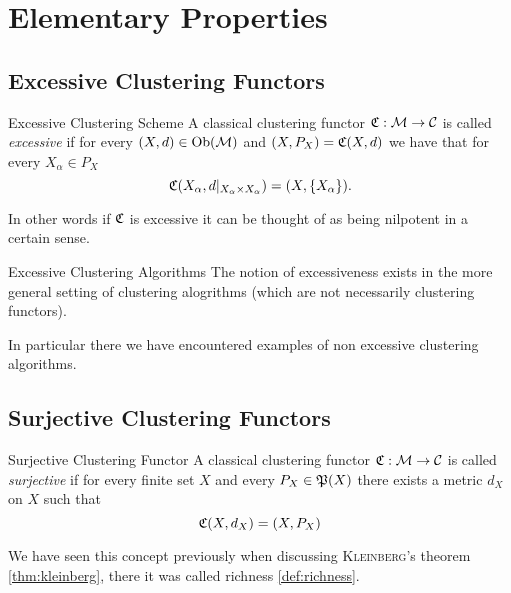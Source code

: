 \section{Elementary Properties}
\subsection{Excessive Clustering Functors}
\begin{definition}{Excessive Clustering Scheme}{}
A classical clustering functor $\Cf: \M \to \C$ is called \emph{excessive} if for every $(X,d) \in \ob(\M)$ and $(X,P_X) = \Cf(X,d)$ we have that for every $X_\alpha \in P_X$
\begin{equation*}
    \Cf(X_\alpha, d|_{X_\alpha \times X_\alpha}) = (X,\{X_\alpha\}).
\end{equation*}
\end{definition}
In other words if $\Cf$ is excessive it can be thought of as being nilpotent in a certain sense.

\begin{myremark}{Excessive Clustering Algorithms}{}
The notion of excessiveness exists in the more general setting of clustering alogrithms (which are not necessarily clustering functors).
\end{myremark}

In particular there we have encountered examples of non excessive clustering algorithms.



\subsection{Surjective Clustering Functors}
\begin{definition}{Surjective Clustering Functor}{}
A classical clustering functor $\Cf: \M \to \C$ is called \emph{surjective} if for every finite set $X$ and every $P_X \in \P(X)$ there exists a metric $d_X$ on $X$ such that
\begin{equation*}
    \Cf(X,d_X) = (X,P_X)
\end{equation*}
\end{definition}

We have seen this concept previously when discussing \textsc{Kleinberg}'s theorem \ref{thm:kleinberg}, there it was called richness \ref{def:richness}.

